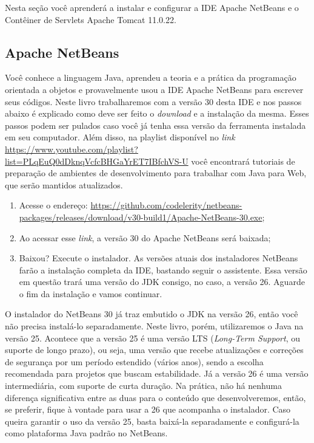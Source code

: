 Nesta seção você aprenderá a instalar e configurar a IDE Apache NetBeans e o Contêiner de Servlets Apache Tomcat 11.0.22.


\subsection{Apache NetBeans}

Você conhece a linguagem Java, aprendeu a teoria e a prática da programação orientada a objetos e provavelmente usou a IDE Apache NetBeans para escrever seus códigos. Neste livro trabalharemos com a versão 30 desta IDE e nos passos abaixo é explicado como deve ser feito o \textit{download} e a instalação da mesma. Esses passos podem ser pulados caso você já tenha essa versão da ferramenta instalada em seu computador. Além disso, na playlist disponível no \textit{link} \url{https://www.youtube.com/playlist?list=PLqEuQ0dDknqVcfcBHGaYrET7IBfchVS-U} você encontrará tutoriais de preparação de ambientes de desenvolvimento para trabalhar com Java para Web, que serão mantidos atualizados.

\begin{enumerate}

    \item Acesse o endereço: \url{https://github.com/codelerity/netbeans-packages/releases/download/v30-build1/Apache-NetBeans-30.exe};
    
    \item Ao acessar esse \textit{link}, a versão 30 do Apache NetBeans será baixada;
    
    \item Baixou? Execute o instalador. As versões atuais dos instaladores NetBeans farão a instalação completa da IDE, bastando seguir o assistente. Essa versão em questão trará uma versão do JDK consigo, no caso, a versão 26. Aguarde o fim da instalação e vamos continuar.

\end{enumerate}

\begin{observacao}
    O instalador do NetBeans 30 já traz embutido o JDK na versão 26, então você não precisa instalá-lo separadamente. Neste livro, porém, utilizaremos o Java na versão 25. Acontece que a versão 25 é uma versão LTS (\textit{Long-Term Support}, ou suporte de longo prazo), ou seja, uma versão que recebe atualizações e correções de segurança por um período estendido (vários anos), sendo a escolha recomendada para projetos que buscam estabilidade. Já a versão 26 é uma versão intermediária, com suporte de curta duração. Na prática, não há nenhuma diferença significativa entre as duas para o conteúdo que desenvolveremos, então, se preferir, fique à vontade para usar a 26 que acompanha o instalador. Caso queira garantir o uso da versão 25, basta baixá-la separadamente e configurá-la como plataforma Java padrão no NetBeans.
\end{observacao}

